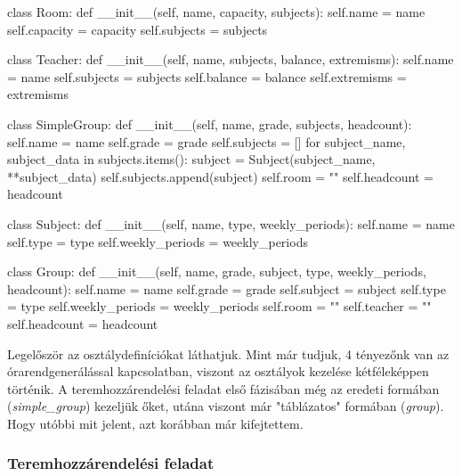 \documentclass[a4paper,12pt]{article}
\begin{document}
\begin{python}
class Room:
    def __init__(self, name, capacity, subjects):
        self.name = name
        self.capacity = capacity
        self.subjects = subjects


class Teacher:
    def __init__(self, name, subjects, balance, extremisms):
        self.name = name
        self.subjects = subjects
        self.balance = balance
        self.extremisms = extremisms


class SimpleGroup:
    def __init__(self, name, grade, subjects, headcount):
        self.name = name
        self.grade = grade
        self.subjects = []
        for subject_name, subject_data in subjects.items():
            subject = Subject(subject_name, **subject_data)
            self.subjects.append(subject)
        self.room = ""
        self.headcount = headcount


class Subject:
    def __init__(self, name, type, weekly_periods):
        self.name = name
        self.type = type
        self.weekly_periods = weekly_periods


class Group:
    def __init__(self, name, grade, subject, type, weekly_periods, headcount):
        self.name = name
        self.grade = grade
        self.subject = subject
        self.type = type
        self.weekly_periods = weekly_periods
        self.room = ""
        self.teacher = ""
        self.headcount = headcount
\end{python}

Legelőször az osztálydefiníciókat láthatjuk. Mint már tudjuk, 4 tényezőnk van az órarendgenerálással kapcsolatban, viszont az osztályok kezelése kétféleképpen történik. A teremhozzárendelési feladat első fázisában még az eredeti formában (\textsl{simple_group}) kezeljük őket, utána viszont már "táblázatos" formában (\textsl{group}). Hogy utóbbi mit jelent, azt korábban már kifejtettem.

\subsubsection{Teremhozzárendelési feladat}
\end{document}
